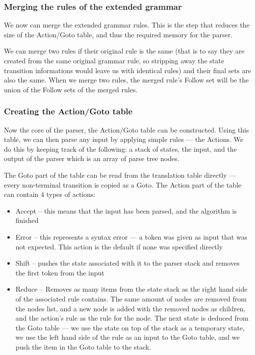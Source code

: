 \subsubsection{Merging the rules of the extended grammar} 
We now can merge the extended grammar rules. This is the step that reduces the size of the Action/Goto table, and thus the required memory for the parser.

We can merge two rules if their original rule is the same (that is to say they are created from the same original grammar rule, so stripping away the state transition informations would leave us with identical rules) and their final sets are also the same. When we merge two rules, the merged rule's Follow set will be the union of the Follow sets of the merged rules. 
\subsubsection{Creating the Action/Goto table} 
Now the core of the parser, the Action/Goto table can be constructed. Using this table, we can then parse any input by applying simple rules --- the Actions. We do this by keeping track of the following: a stack of states, the input, and the output of the parser which is an array of parse tree nodes.

The Goto part of the table can be read from the translation table directly --- every non-terminal transition is copied as a Goto. The Action part of the table can contain 4 types of actions:
\begin{itemize}
\item Accept -- this means that the input has been parsed, and the algorithm is finished
\item Error -- this represents a syntax error --- a token was given as input that was not expected. This action is the default if none was specified directly
\item Shift -- pushes the state associated with it to the parser stack and removes the first token from the input
\item Reduce -- Removes as many items from the state stack as the right hand side of the associated rule contains. The same amount of nodes are removed from the nodes list, and a new node is added with the removed nodes as children, and the action's rule as the rule for the node. The next state is deduced from the Goto table --- we use the state on top of the stack as a temporary state, we use the left hand side of the rule as an input to the Goto table, and we push the item in the Goto table to the stack.
\end{itemize}

